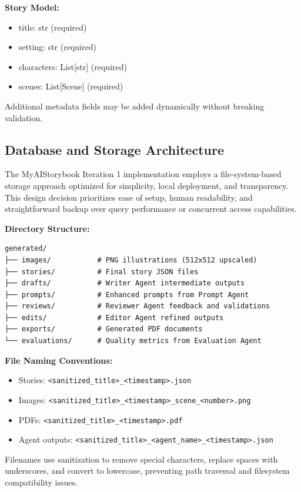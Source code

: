 \textbf{Story Model:}
\begin{itemize}
    \item title: str (required)
    \item setting: str (required)
    \item characters: List[str] (required)
    \item scenes: List[Scene] (required)
\end{itemize}

Additional metadata fields may be added dynamically without breaking validation.

\subsection{Database and Storage Architecture}
The MyAIStorybook Iteration 1 implementation employs a file-system-based storage approach optimized for simplicity, local deployment, and transparency. This design decision prioritizes ease of setup, human readability, and straightforward backup over query performance or concurrent access capabilities.

\textbf{Directory Structure:}
\begin{verbatim}
generated/
├── images/           # PNG illustrations (512x512 upscaled)
├── stories/          # Final story JSON files
├── drafts/           # Writer Agent intermediate outputs
├── prompts/          # Enhanced prompts from Prompt Agent
├── reviews/          # Reviewer Agent feedback and validations
├── edits/            # Editor Agent refined outputs
├── exports/          # Generated PDF documents
└── evaluations/      # Quality metrics from Evaluation Agent
\end{verbatim}

\textbf{File Naming Conventions:}
\begin{itemize}
    \item Stories: \texttt{<sanitized\_title>\_<timestamp>.json}
    \item Images: \texttt{<sanitized\_title>\_<timestamp>\_scene\_<number>.png}
    \item PDFs: \texttt{<sanitized\_title>\_<timestamp>.pdf}
    \item Agent outputs: \texttt{<sanitized\_title>\_<agent\_name>\_<timestamp>.json}
\end{itemize}

Filenames use sanitization to remove special characters, replace spaces with underscores, and convert to lowercase, preventing path traversal and filesystem compatibility issues.


